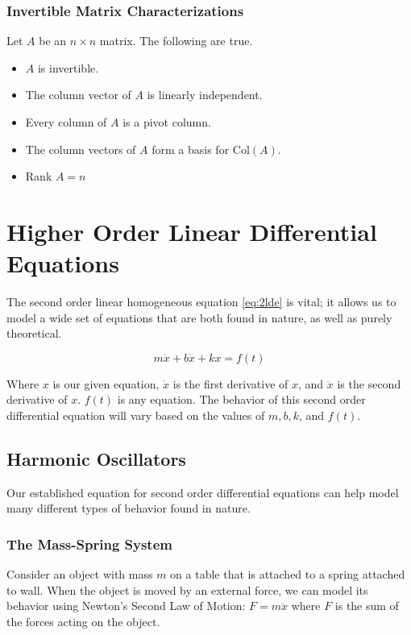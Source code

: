 \documentclass[12pt, landscape, twocolumn]{article}
\begin{document}
        \subsubsection{Invertible Matrix Characterizations}
        Let $A$ be an $n \times n$ matrix. The following are true.
        \begin{itemize}
            \item $A$ is invertible.
            \item The column vector of $A$ is linearly independent.
            \item Every column of $A$ is a pivot column.
            \item The column vectors of $A$ form a basis for Col$(A)$.
            \item Rank $A = n$
        \end{itemize}
\section{Higher Order Linear Differential Equations}
The second order linear homogeneous equation \eqref{eq:2lde} is vital; it allows us to model a wide set of equations that are both found in nature, as well as purely theoretical.

    \begin{equation}\label{eq:2lde}
        m \ddot{x} + b \dot{x} + kx = f(t)
    \end{equation}

    Where $x$ is our given equation, $\dot{x}$ is the first derivative of $x$, and $\ddot{x}$ is the second derivative of $x$. $f(t)$ is any equation. The behavior of this second order differential equation will vary based on the values of $m, b, k$, and $f(t)$.

    \subsection{Harmonic Oscillators}
    Our established equation for second order differential equations can help model many different types of behavior found in nature.

        \subsubsection{The Mass-Spring System}
        Consider an object with mass $m$ on a table that is attached to a spring attached to wall. When the object is moved by an external force, we can model its behavior using Newton's Second Law of Motion: $F = m \ddot{x}$ where $F$ is the sum of the forces acting on the object.
\end{document}
